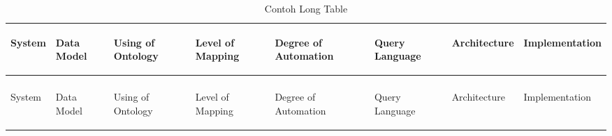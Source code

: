 \begin{longtable}{|p{}|p{}|p{}|p{}|p{}|p{}|p{}|p{}|}
\hline 
\begin{sideways}
{\small System}%
\end{sideways}&
\begin{sideways}
{\small Data Model}%
\end{sideways}&
\begin{sideways}
{\small Using of Ontology}%
\end{sideways}&
\begin{sideways}
{\small Level of Mapping}%
\end{sideways}&
\begin{sideways}
{\small Degree of Automation}%
\end{sideways}&
\begin{sideways}
{\small Query Language}%
\end{sideways}&
\begin{sideways}
{\small Architecture}%
\end{sideways}&
\begin{sideways}
{\small Implementation}%
\end{sideways}\tabularnewline
\hline
\endhead
\hline 
\caption{Contoh Long Table  \label{tbl:2-ContohLongTabel}}\\\hline{}\begin{sideways}{\small System}\end{sideways}&
\begin{sideways}
{\small Data Model}%
\end{sideways}&
\begin{sideways}
{\small Using of Ontology}%
\end{sideways}&
\begin{sideways}
{\small Level of Mapping}%
\end{sideways}&
\begin{sideways}
{\small Degree of Automation}%
\end{sideways}&
\begin{sideways}
{\small Query Language}%
\end{sideways}&
\begin{sideways}
{\small Architecture}%
\end{sideways}&
\begin{sideways}
{\small Implementation}%
\end{sideways}\tabularnewline
\hline
\endfirsthead

\end{longtable}
